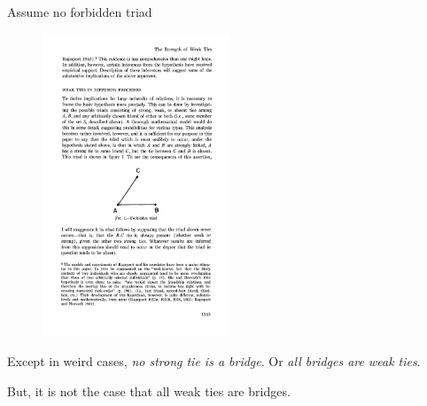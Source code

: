 \documentclass[aspectratio=169]{beamer}
\begin{document}
\begin{frame}

Assume no forbidden triad

\begin{figure}
\includegraphics[width =0.5\textwidth]{figures/granovetter_strength_1973_fig1}
\end{figure}



\end{frame}
\begin{frame}

Except in weird cases, \emph{no strong tie is a bridge}.  Or \emph{all bridges are weak ties}.

\vfill
But, it is not the case that all weak ties are bridges.


\end{frame}
\end{document}
